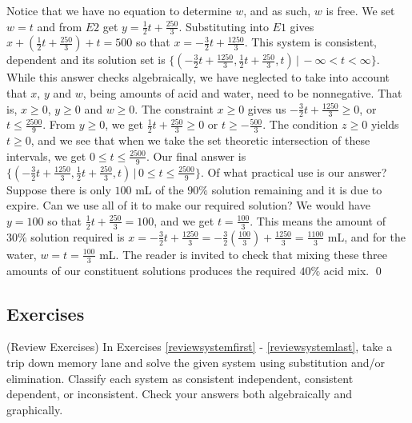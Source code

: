 \begin{ex}
Notice that we have no equation to determine $w$, and as such, $w$ is free.  We set $w = t$ and from $E2$ get $y = \frac{1}{2} t + \frac{250}{3}$.  Substituting into $E1$ gives $x + \left(\frac{1}{2} t + \frac{250}{3}\right) + t = 500$ so that $x = -\frac{3}{2} t + \frac{1250}{3}$.  This system is consistent, dependent and its solution set is $\{ \left(-\frac{3}{2} t + \frac{1250}{3}, \frac{1}{2} t + \frac{250}{3}, t\right) \, | \, - \infty < t < \infty\}$.  While this answer checks algebraically, we have neglected to take into account that $x$, $y$ and $w$, being amounts of acid and water, need to be nonnegative.  That is, $x \geq 0$, $y \geq 0$ and $w \geq 0$.  The constraint $x \geq 0$ gives us  $-\frac{3}{2} t + \frac{1250}{3} \geq 0$, or $t \leq \frac{2500}{9}$. From $y \geq 0$, we get $\frac{1}{2} t + \frac{250}{3} \geq 0$ or $t \geq -\frac{500}{3}$.  The condition $z \geq 0$ yields $t \geq 0$, and we see that when we take the set theoretic intersection of these intervals, we get $0 \leq t \leq \frac{2500}{9}$.  Our final answer is $\{ \left(-\frac{3}{2} t + \frac{1250}{3}, \frac{1}{2} t + \frac{250}{3}, t\right) \, | \,0 \leq t \leq \frac{2500}{9} \}$.  Of what practical use is our answer?  Suppose there is only $100$ mL of the $90 \%$ solution remaining and it is due to expire.  Can we use all of it to make our required solution?  We would have $y = 100$ so that $\frac{1}{2} t + \frac{250}{3} = 100$, and we get $t = \frac{100}{3}$.  This means the amount of $30 \%$ solution required is $x = -\frac{3}{2} t + \frac{1250}{3} =  -\frac{3}{2} \left(\frac{100}{3}\right) + \frac{1250}{3} = \frac{1100}{3}$ mL, and for the water, $w = t = \frac{100}{3}$ mL.  The reader is invited to check that mixing these three amounts of our constituent solutions produces the required $40 \%$ acid mix.  \qed

\end{ex}

\newpage

\subsection{Exercises}

(Review Exercises) In Exercises \ref{reviewsystemfirst} - \ref{reviewsystemlast}, take a trip down memory lane and solve the given system using substitution and/or elimination. Classify each system as consistent independent, consistent dependent, or inconsistent. Check your answers both algebraically and graphically.

